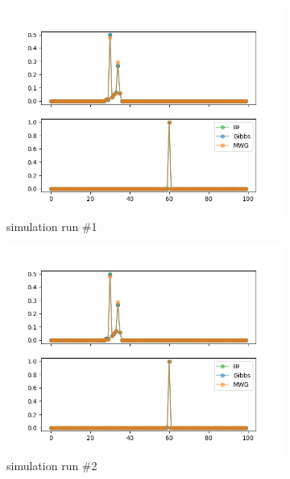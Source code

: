 \begin{figure}[H]
    \centering
    \begin{subfigure}{.3\textwidth}
    	\centering
        \includegraphics[width=\linewidth]{../../plots/Posterior_post_burnin_M3_N100_NMCMC3_seed0_diffind2.png}
        \caption{simulation run \#1}
    \end{subfigure}
    \begin{subfigure}{.3\textwidth}
        \centering
    	\includegraphics[width=\linewidth]{../../plots/Posterior_post_burnin_M3_N100_NMCMC3_seed1_diffind2.png}
    	\caption{simulation run \#2}
	\end{subfigure}
	\begin{subfigure}{.3\textwidth}

\end{subfigure}
\end{figure}
